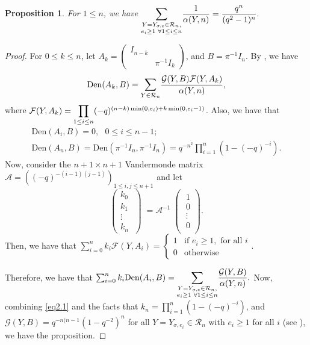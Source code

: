 \documentclass[11pt,oneside]{amsart}
\theoremstyle{plain}
\newtheorem{proposition}[theorem]{Proposition}
\theoremstyle{definition}
\theoremstyle{remark}
\newcommand{\tx}[1]{\text{#1}}
\newcommand{\CA}{{\mathcal A}}
\newcommand{\CF}{{\mathcal F}}
\newcommand{\CG}{{\mathcal G}}
\newcommand{\CR}{{\mathcal R}}
\newcommand{\alphad}{\mathrm{Den}}
\numberwithin{equation}{section}
\begin{document}
	\begin{proposition}\label{proposition2.12} For $1 \leq n$, we have
		$
		\mathlarger{\sum}_{\substack{Y=Y_{\sigma,e} \in \CR_n,\\ e_i \geq 1 \text{ }\forall 1 \leq i \leq n}} \dfrac{1}{\alpha(Y,n)}=\dfrac{q^n}{(q^2-1)^n}.
		$
	\end{proposition}
	\begin{proof}
		For $0 \leq k \leq n$, let $A_k=\left( \begin{array}{cc} I_{n-k} & \\ & \pi^{-1}I_k \end{array} \right)$, and $B=\pi^{-1}I_n$. By \cite[Proposition 3.1]{Cho3}, we have
		\begin{equation*}
			\alphad(A_k,B)=\mathlarger{\sum}_{Y \in \CR_n}\frac{\CG(Y,B)\CF(Y,A_k)}{\alpha(Y,n)},
		\end{equation*}
		where $\CF(Y,A_k)=\mathlarger{\prod}_{1 \leq i \leq n} (-q)^{(n-k)\min(0,e_i)+k\min(0,e_i-1)}$. Also, we have that 
		\begin{equation}\label{eq2.1}\begin{array}{l}
				\alphad(A_i,B)=0, \tx{ } 0 \leq i \leq n-1;\\
				\alphad(A_n,B)=\alphad(\pi^{-1}I_n,\pi^{-1}I_n)=q^{-n^2}\prod_{i=1}^n(1-(-q)^{-i}).
			\end{array}
		\end{equation}
		Now, consider the $n+1 \times n+1$ Vandermonde matrix $\CA=((-q)^{-(i-1)(j-1)})_{1 \leq i,j \leq n+1}$ and let
		\begin{equation*}
			\left( \begin{array}{l} k_0 \\ k_1 \\ \vdots \\ k_n \end{array}\middle)=\CA^{-1} \middle(\begin{array}{l} 1\\0  \\ \vdots \\ 0 \end{array}\right).
		\end{equation*}
		Then, we have that $\sum_{i=0}^{n} k_i \CF(Y,A_i)=\left\lbrace \begin{array}{ll} 1 & \text{if } e_i \geq 1, \text{ for all }i\\
			0 & \tx{otherwise} \end{array}\right.$.
		
		Therefore, we have that $\sum_{i=0}^{n} k_i \alphad(A_i,B)=\mathlarger{\sum}_{\substack{Y=Y_{\sigma,e} \in \CR_n,\\ e_i \geq 1 \text{ }\forall 1 \leq i \leq n}}\dfrac{\CG(Y,B)}{\alpha(Y,n)}.$ Now, combining \eqref{eq2.1} and the facts that $k_n=\prod_{i=1}^n(1-(-q)^{-i})$, and $\CG(Y,B)=q^{-n(n-1}(1-q^{-2})^n$ for all $Y=Y_{\sigma,e_i} \in \CR_n$ with $e_i \geq 1$ for all $i$ (see \cite[Proposition 4.2]{Hi}), we have the proposition.
	\end{proof}
	
\end{document}
